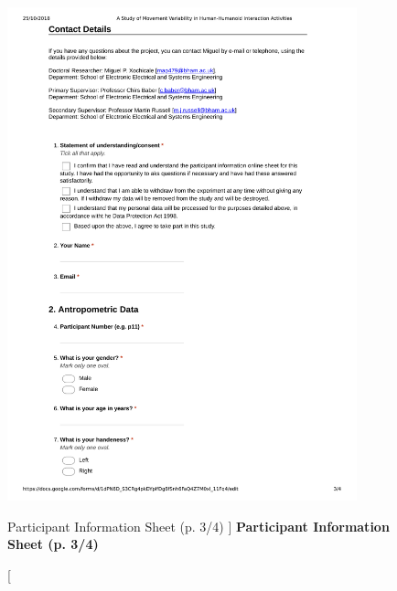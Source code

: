 \begin{figure}
 \centering
   \includegraphics[width=0.9\textwidth]{epi3}
   \caption
	[Participant Information Sheet (p. 3/4) ]{
	{\bf Participant Information Sheet (p. 3/4)}
}
   \label{fig:epi3}
\end{figure}
